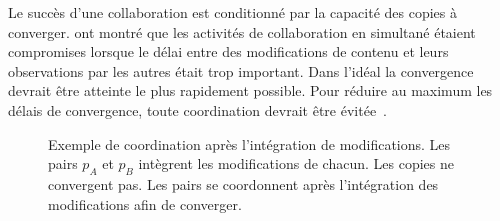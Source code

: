 
Le succès d'une collaboration est conditionné par la capacité des copies à converger.
\textcite{ignat_2015_user-and-delay} ont montré que les activités de collaboration en simultané étaient compromises lorsque le délai entre des modifications de contenu et leurs observations par les autres était trop important.
Dans l'idéal la convergence devrait être atteinte le plus rapidement possible.
Pour réduire au maximum les délais de convergence, toute coordination devrait être évitée~\autocite{bailis_coordavoidance_2014}.

\begin{figure}[htb]
\newcommand*\hsep{1.7}
\newcommand*\vsep{-1.4}
\centering
{}
\caption[Réplication optimiste et coordination]{Exemple de coordination après l'intégration de modifications.
Les pairs $p_A$ et $p_B$ intègrent les modifications de chacun.
Les copies ne convergent pas.
Les pairs se coordonnent après l'intégration des modifications afin de converger.}\label{fig:convergence-post-coord}
\end{figure}


